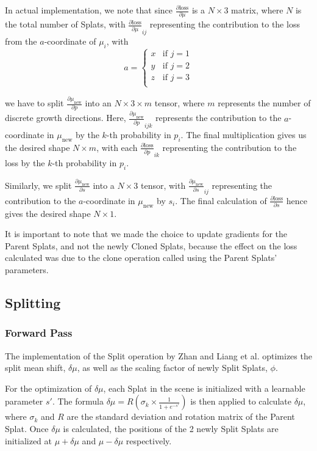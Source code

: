 \documentclass[11pt]{report}
\begin{document}
In actual implementation, we note that since $\frac{\partial \text{loss}}{\partial \mu}$ is a $N \times 3$ matrix, where $N$ is the total number of Splats, with $\frac{\partial \text{loss}}{\partial \mu}_{ij}$ representing the contribution to the loss from the $a$-coordinate of $\mu_{i}$, with
\[ a = \begin{cases}
x & \textrm{if }j=1\\
y & \textrm{if }j=2\\
z & \textrm{if }j=3\\
\end{cases} \]

we have to split $\frac{\partial \mu_{\text{new}}}{\partial p}$ into an $N \times 3 \times m$ tensor, where $m$ represents the number of discrete growth directions. Here, $\frac{\partial \mu_{\text{new}}}{\partial p}_{ijk}$ represents the contribution to the $a$-coordinate in $\mu_{\text{new}}$ by the $k$-th probability in $p_i$. The final multiplication gives us the desired shape $N \times m$, with each $\frac{\partial \text{loss}}{\partial p}_{ik}$ representing the contribution to the loss by the $k$-th probability in $p_i$.

Similarly, we split $\frac{\partial \mu_{\text{new}}}{\partial s}$ into a $N \times 3$ tensor, with $\frac{\partial \mu_{\text{new}}}{\partial s}_{ij}$ representing the contribution to the $a$-coordinate in $\mu_{\text{new}}$ by $s_{i}$. The final calculation of $\frac{\partial \text{loss}}{\partial s}$ hence gives the desired shape $N \times 1$.

It is important to note that we made the choice to update gradients for the Parent Splats, and not the newly Cloned Splats, because the effect on the loss calculated was due to the clone operation called using the Parent Splats' parameters.

\subsection{Splitting}
\subsubsection{Forward Pass}
The implementation of the Split operation by Zhan and Liang et al. optimizes the split mean shift, $\delta \mu$, as well as the scaling factor of newly Split Splats, $\phi$.

For the optimization of $\delta \mu$, each Splat in the scene is initialized with a learnable parameter $s'$. The formula $\delta \mu = R(\sigma_{k} \times \frac{1}{1 + e^{-s'}})$ is then applied to calculate $\delta \mu$, where $\sigma_{k}$ and $R$ are the standard deviation and rotation matrix of the Parent Splat. Once $\delta \mu$ is calculated, the positions of the 2 newly Split Splats are initialized at $\mu + \delta \mu$ and $\mu - \delta \mu$ respectively.
\end{document}
